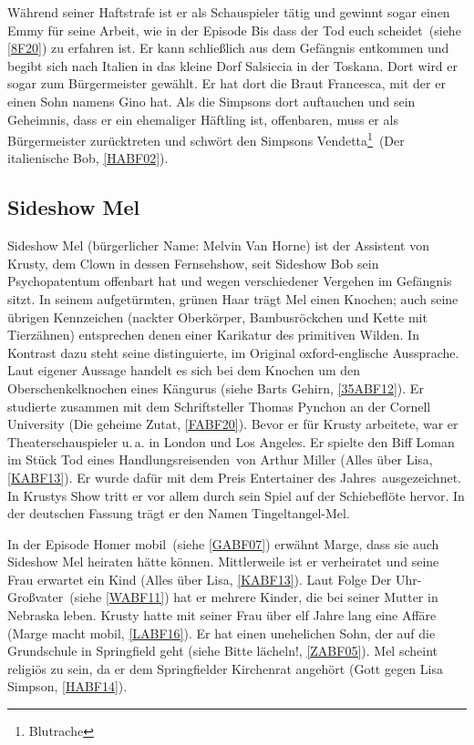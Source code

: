 Während seiner Haftstrafe ist er als Schauspieler tätig und gewinnt sogar einen Emmy für seine Arbeit, wie in der Episode \glqq Bis dass der Tod euch scheidet\grqq\ (siehe \ref{8F20}) zu erfahren ist. Er kann schließlich aus dem Gefängnis entkommen und begibt sich nach Italien in das kleine Dorf Salsiccia in der Toskana. Dort wird er sogar zum Bürgermeister gewählt. Er hat dort die Braut Francesca, mit der er einen Sohn namens Gino hat. Als die Simpsons dort auftauchen und sein Geheimnis, dass er ein ehemaliger Häftling ist, offenbaren, muss er als Bürgermeister zurücktreten und schwört den Simpsons \glqq Vendetta\footnote{Blutrache}\grqq\ (\glqq Der italienische Bob\grqq , \ref{HABF02}).

\subsection{Sideshow Mel}\label{MelvinVanHorne}
Sideshow Mel (bürgerlicher Name: Melvin Van Horne) ist der Assistent von Krusty, dem Clown in dessen Fernsehshow, seit Sideshow Bob sein Psychopatentum offenbart hat und wegen verschiedener Vergehen im Gefängnis sitzt. In seinem aufgetürmten, grünen Haar trägt Mel einen Knochen; auch seine übrigen Kennzeichen (nackter Oberkörper, Bambusröckchen und Kette mit Tierzähnen) entsprechen denen einer Karikatur des \glqq primitiven Wilden\grqq . In Kontrast dazu steht seine distinguierte, im Original oxford-englische Aussprache. Laut eigener Aussage handelt es sich bei dem Knochen um den Oberschenkelknochen eines Kängurus (siehe \glqq Barts Gehirn\grqq, \ref{35ABF12}). Er studierte zusammen mit dem Schriftsteller Thomas Pynchon an der Cornell University (\glqq Die geheime Zutat\grqq , \ref{FABF20}). Bevor er für Krusty arbeitete, war er Theaterschauspieler u.\,a. in London und Los Angeles. Er spielte den Biff Loman im Stück \glqq Tod eines Handlungsreisenden\grqq\ von Arthur Miller (\glqq Alles über Lisa\grqq , \ref{KABF13}). Er wurde dafür mit dem Preis \glqq Entertainer des Jahres\grqq\ ausgezeichnet. In Krustys Show tritt er vor allem durch sein Spiel auf der Schiebeflöte hervor. In der deutschen Fassung trägt er den Namen Tingeltangel-Mel.

In der Episode \glqq Homer mobil\grqq\ (siehe \ref{GABF07}) erwähnt Marge, dass sie auch Sideshow Mel heiraten hätte können. Mittlerweile ist er verheiratet und seine Frau erwartet ein Kind (\glqq Alles über Lisa\grqq , \ref{KABF13}). Laut Folge \glqq Der Uhr-Großvater\grqq\ (siehe \ref{WABF11}) hat er mehrere Kinder, die bei seiner Mutter in Nebraska leben. Krusty hatte mit seiner Frau über elf Jahre lang eine Affäre (\glqq Marge macht mobil\grqq , \ref{LABF16}). Er hat einen unehelichen Sohn, der auf die Grundschule in Springfield geht (siehe \glqq Bitte lächeln!\grqq, \ref{ZABF05}). Mel scheint religiös zu sein, da er dem Springfielder Kirchenrat angehört (\glqq Gott gegen Lisa Simpson\grqq, \ref{HABF14}).

